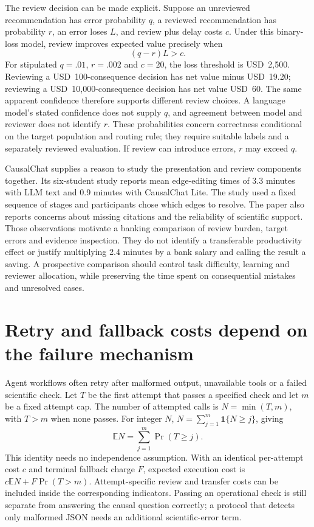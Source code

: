 The review decision can be made explicit. Suppose an unreviewed recommendation
has error probability $q$, a reviewed recommendation has probability $r$, an
error loses $L$, and review plus delay costs $c$. Under this binary-loss model,
review improves expected value precisely when
\[
 (q-r)L>c.
\]
For stipulated $q=.01$, $r=.002$ and $c=20$, the loss threshold is USD~2,500.
Reviewing a USD~100-consequence decision has net value minus USD~19.20;
reviewing a USD~10,000-consequence decision has net value USD~60. The same
apparent confidence therefore supports different review choices. A language
model's stated confidence does not supply $q$, and agreement between model
and reviewer does not identify $r$. These probabilities concern correctness
conditional on the target population and routing rule; they require suitable
labels and a separately reviewed evaluation. If review can introduce errors,
$r$ may exceed $q$. \citep{exec14_l8_economics}

CausalChat supplies a reason to study the presentation and review components
together. Its six-student study reports mean edge-editing times of 3.3 minutes
with LLM text and 0.9 minutes with CausalChat Lite. The study used a fixed
sequence of stages and participants chose which edges to resolve. The paper
also reports concerns about missing citations and the reliability of scientific
support. Those observations motivate a banking comparison of review burden,
target errors and evidence inspection. They do not identify a transferable
productivity effect or justify multiplying 2.4 minutes by a bank salary and
calling the result a saving. A prospective comparison should control task
difficulty, learning and reviewer allocation, while preserving the time spent
on consequential mistakes and unresolved cases. \citep{v12_la_2410_14146}

\section{Retry and fallback costs depend on the failure mechanism}
\label{exec14:l8-retry}

Agent workflows often retry after malformed output, unavailable tools or a
failed scientific check. Let $T$ be the first attempt that passes a specified
check and let $m$ be a fixed attempt cap. The number of attempted calls is
$N=\min(T,m)$, with $T>m$ when none passes. For integer $N$,
$N=\sum_{j=1}^{m}\mathbf1\{N\geq j\}$, giving
\[
 \mathbb E N=\sum_{j=1}^{m}\Pr(T\geq j).
\]
This identity needs no independence assumption. With an identical per-attempt
cost $c$ and terminal fallback charge $F$, expected execution cost is
$c\mathbb E N+F\Pr(T>m)$. Attempt-specific review and transfer costs can be
included inside the corresponding indicators. Passing an operational check
is still separate from answering the causal question correctly; a protocol
that detects only malformed JSON needs an additional scientific-error term.
\citep{exec14_l8_economics}

